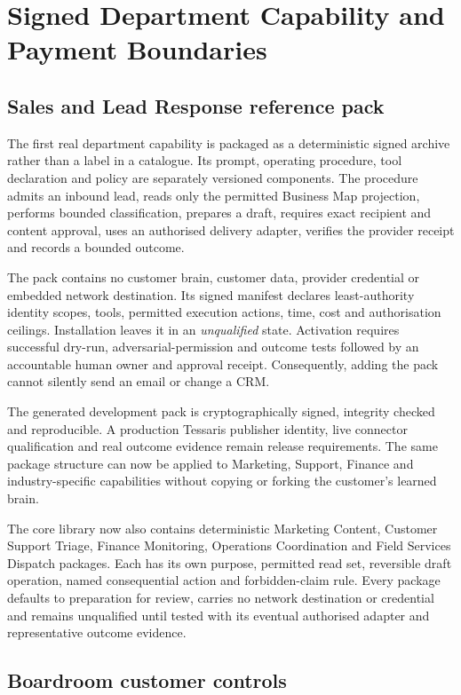 \section{Signed Department Capability and Payment Boundaries}

\subsection{Sales and Lead Response reference pack}

The first real department capability is packaged as a deterministic signed archive rather than a
label in a catalogue. Its prompt, operating procedure, tool declaration and policy are separately
versioned components. The procedure admits an inbound lead, reads only the permitted Business Map
projection, performs bounded classification, prepares a draft, requires exact recipient and
content approval, uses an authorised delivery adapter, verifies the provider receipt and records a
bounded outcome.

The pack contains no customer brain, customer data, provider credential or embedded network
destination. Its signed manifest declares least-authority identity scopes, tools, permitted
execution actions, time, cost and authorisation ceilings. Installation leaves it in an
\emph{unqualified} state. Activation requires successful dry-run, adversarial-permission and
outcome tests followed by an accountable human owner and approval receipt. Consequently, adding
the pack cannot silently send an email or change a CRM.

The generated development pack is cryptographically signed, integrity checked and reproducible.
A production Tessaris publisher identity, live connector qualification and real outcome evidence
remain release requirements. The same package structure can now be applied to Marketing, Support,
Finance and industry-specific capabilities without copying or forking the customer's learned
brain.

The core library now also contains deterministic Marketing Content, Customer Support Triage,
Finance Monitoring, Operations Coordination and Field Services Dispatch packages. Each has its
own purpose, permitted read set, reversible draft operation, named consequential action and
forbidden-claim rule. Every package defaults to preparation for review, carries no network
destination or credential and remains unqualified until tested with its eventual authorised
adapter and representative outcome evidence.

\subsection{Boardroom customer controls}

